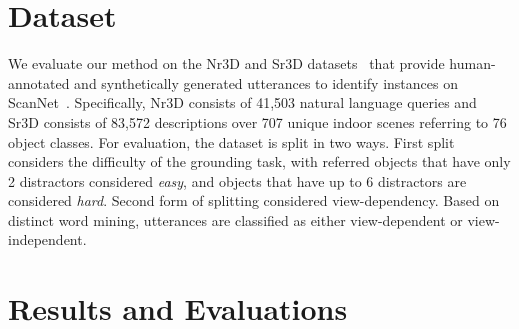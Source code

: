 \documentclass[10pt,twocolumn,letterpaper]{article}
\begin{document}



{\small


}


\clearpage
\clearpage

\appendix


\section{Dataset} We evaluate our method on the Nr3D and Sr3D datasets~\cite{achlioptas2020referit_3d} that provide human-annotated and synthetically generated utterances to identify instances on ScanNet~\cite{dai2017scannet}.
Specifically, Nr3D consists of 41,503 natural language queries and Sr3D consists of 83,572 descriptions over 707 unique indoor scenes referring to 76 object classes. For evaluation, the dataset is split in two ways. First split considers the difficulty of the grounding task, with referred objects that have only 2 distractors considered \textit{easy}, and objects that have up to 6 distractors are considered \textit{hard}. Second form of splitting considered view-dependency. Based on distinct word mining, utterances are classified as either view-dependent or view-independent.
\section{Results and Evaluations}
\end{document}
